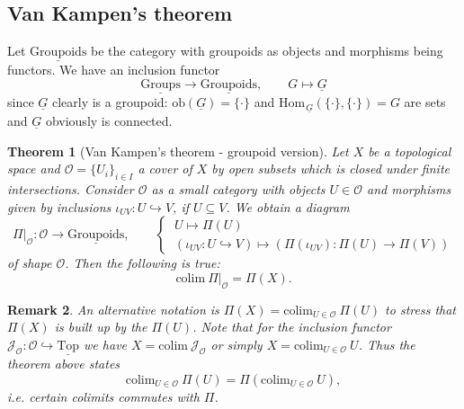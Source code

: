 \documentclass[11pt]{book}
\numberwithin{dummy}{section}
\newtheorem{theorem}{Theorem}[section]
\newtheorem{remark}[theorem]{Remark}
\theoremstyle{nonumberbreak}
\newcommand{\Hom}{\mathrm{Hom}\hspace{1pt}}
\newcommand{\grp}{\underline{\mathrm{Groups}}}
\newcommand{\topsp}{\underline{\mathrm{Top}}}
\newcommand{\grid}{\underline{\mathrm{Groupoids}}}
\newcommand{\la}{\longrightarrow}
\begin{document}
\begin{spacing}{1.4}
\newpage







\section{Van Kampen's theorem} %


Let $\grid$ be the category with groupoids as objects and morphisms being functors. We have an inclusion functor
$$\grp \la \grid, \qquad G \mapsto \underline{G}$$
since $\underline{G}$ clearly is a groupoid: $\mathrm{ob}(\underline{G})=\{\cdot\}$ and $\Hom_{\underline{G}}(\{\cdot\}, \{\cdot\})=G$ are sets and $\underline{G}$ obviously is connected.


\begin{theorem}[Van Kampen's theorem - groupoid version]
Let $X$ be a topological space and $\mathcal{O}=\{U_i\}_{i \in I}$ a cover of $X$ by open subsets which is closed under finite intersections. Consider $\mathcal{O}$ as a small category with objects $U \in \mathcal{O}$ and morphisms given by inclusions $\iota_{UV}: U \hookrightarrow V$, if $U \subseteq V$. We obtain a diagram
$$\Pi \vert_{\mathcal{O}} : \mathcal{O} \la \grid, \qquad \begin{cases} \ U \mapsto \Pi(U) \\ \ (\iota_{UV}:U \hookrightarrow V) \mapsto (\Pi(\iota_{UV}): \Pi(U) \la \Pi(V)) \end{cases}$$
of shape $\mathcal{O}$. Then the following is true:
$$\mathrm{colim} \ \Pi \vert_{\mathcal{O}} = \Pi(X).$$

\end{theorem}


\begin{remark}
An alternative notation is $\Pi(X) = \mathrm{colim}_{U \in \mathcal{O}}\ \Pi(U)$ to stress that $\Pi(X)$ is built up by the $\Pi(U)$. Note that for the inclusion functor $\mathcal{J}_{\mathcal{O}} : \mathcal{O} \hookrightarrow \topsp$ we have $X= \mathrm{colim} \ \mathcal{J}_{\mathcal{O}}$ or simply $X= \mathrm{colim}_{U \in \mathcal{O}} \ U$. Thus the theorem above states
$$\mathrm{colim}_{U \in \mathcal{O}} \ \Pi(U) = \Pi\left( \mathrm{colim}_{U \in \mathcal{O}} \ U\right),$$
i.e. certain colimits commutes with $\Pi$.
\end{remark}



\end{spacing}
\end{document}
